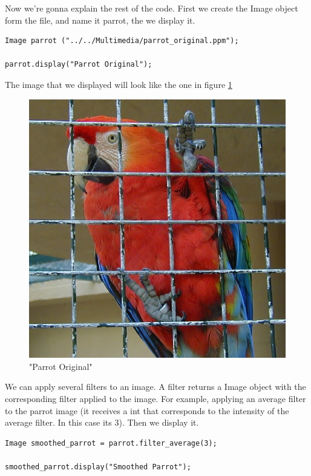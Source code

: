 \documentclass[a4paper]{article}
\begin{document}
Now we're gonna explain the rest of the code. First we create the Image object form the file, and name it parrot, the we display it.

\begin{lstlisting}
Image parrot ("../../Multimedia/parrot_original.ppm");
		
parrot.display("Parrot Original");
\end{lstlisting}

The image that we displayed will look like the one in figure \ref{parrot_original}
\begin{figure}[H]

\centering
\includegraphics[scale=0.5]{./.Multimedia/parrot_original.jpg}

\caption{"Parrot Original"}
\label{parrot_original}

\end{figure}

We can apply several filters to an image. A filter returns a Image object with the corresponding filter applied to the image. For example, applying an average filter to the parrot image (it receives a int that corresponds to the intensity of the average filter. In this case its 3). Then we display it.
\begin{lstlisting}
Image smoothed_parrot = parrot.filter_average(3);
	
smoothed_parrot.display("Smoothed Parrot");
\end{lstlisting}
\end{document}
